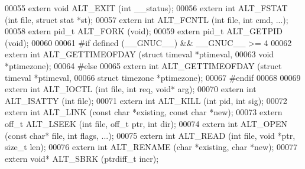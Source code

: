 \begin{DoxyCode}
00055 \textcolor{keyword}{extern} \textcolor{keywordtype}{void}    ALT_EXIT (\textcolor{keywordtype}{int} \_\_status);
00056 \textcolor{keyword}{extern} \textcolor{keywordtype}{int}     ALT_FSTAT (\textcolor{keywordtype}{int} file, \textcolor{keyword}{struct} stat *st);
00057 \textcolor{keyword}{extern} \textcolor{keywordtype}{int}     ALT_FCNTL (\textcolor{keywordtype}{int} file, \textcolor{keywordtype}{int} cmd, ...);
00058 \textcolor{keyword}{extern} pid\_t   ALT_FORK (\textcolor{keywordtype}{void});
00059 \textcolor{keyword}{extern} pid\_t   ALT_GETPID (\textcolor{keywordtype}{void});
00060 
00061 \textcolor{preprocessor}{#if defined (\_\_GNUC\_\_) && \_\_GNUC\_\_ >= 4}
00062 \textcolor{keyword}{extern} \textcolor{keywordtype}{int}     ALT_GETTIMEOFDAY (\textcolor{keyword}{struct} timeval  *ptimeval, 
00063                                  \textcolor{keywordtype}{void} *ptimezone);
00064 \textcolor{preprocessor}{#else}
00065 \textcolor{keyword}{extern} \textcolor{keywordtype}{int}     ALT_GETTIMEOFDAY (\textcolor{keyword}{struct} timeval  *ptimeval, 
00066                                  \textcolor{keyword}{struct} timezone *ptimezone);
00067 \textcolor{preprocessor}{#endif}
00068 
00069 \textcolor{keyword}{extern} \textcolor{keywordtype}{int}     ALT_IOCTL (\textcolor{keywordtype}{int} file, \textcolor{keywordtype}{int} req, \textcolor{keywordtype}{void}* arg);
00070 \textcolor{keyword}{extern} \textcolor{keywordtype}{int}     ALT_ISATTY (\textcolor{keywordtype}{int} file);
00071 \textcolor{keyword}{extern} \textcolor{keywordtype}{int}     ALT_KILL (\textcolor{keywordtype}{int} pid, \textcolor{keywordtype}{int} sig);
00072 \textcolor{keyword}{extern} \textcolor{keywordtype}{int}     ALT_LINK (\textcolor{keyword}{const} \textcolor{keywordtype}{char} *existing, \textcolor{keyword}{const} \textcolor{keywordtype}{char} *\textcolor{keyword}{new});
00073 \textcolor{keyword}{extern} off\_t   ALT_LSEEK (\textcolor{keywordtype}{int} file, off\_t ptr, \textcolor{keywordtype}{int} dir);
00074 \textcolor{keyword}{extern} \textcolor{keywordtype}{int}     ALT_OPEN (\textcolor{keyword}{const} \textcolor{keywordtype}{char}* file, \textcolor{keywordtype}{int} flags, ...);
00075 \textcolor{keyword}{extern} \textcolor{keywordtype}{int}     ALT_READ (\textcolor{keywordtype}{int} file, \textcolor{keywordtype}{void} *ptr, \textcolor{keywordtype}{size\_t} len);
00076 \textcolor{keyword}{extern} \textcolor{keywordtype}{int}     ALT_RENAME (\textcolor{keywordtype}{char} *existing, \textcolor{keywordtype}{char} *\textcolor{keyword}{new});
00077 \textcolor{keyword}{extern} \textcolor{keywordtype}{void}*   ALT_SBRK (ptrdiff\_t incr);

\end{DoxyCode}
